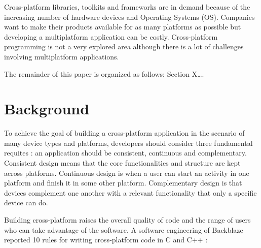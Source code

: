 \documentclass[10pt, conference]{IEEEtran}
\begin{document}
Cross-platform libraries, toolkits and frameworks are in demand because of the increasing number of hardware devices and Operating Systems (OS). Companies want to make their products available for as many platforms as possible but developing a multiplatform application can be costly. Cross-platform programming is not a very explored area although there is a lot of challenges involving multiplatform applications.   

The remainder of this paper is organized as follows: Section X…. 

\section{Background}

To achieve the goal of building a cross-platform application in the scenario of many device types and platforms, developers should consider three fundamental requites \cite{Levin2014}: an application should be consistent, continuous and complementary. Consistent design means that the core functionalities and structure are kept across platforms. Continuous design is when a user can start an activity in one platform and finish it in some other platform. Complementary design is that devices complement one another with a relevant functionality that only a specific device can do.     


Building cross-platform raises the overall quality of code and the range of users who can take advantage of the software. A software engineering of Backblaze reported 10 rules for writing cross-platform code in C and C++ \cite{backblaze2008}:

\end{document}
